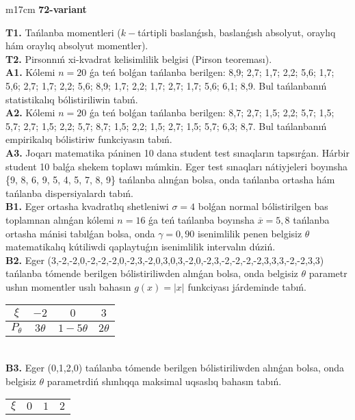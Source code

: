 \documentclass{article}
\begin{document}
\begin{tabular}{m{17cm}}
\textbf{72-variant}
\newline

\textbf{T1.} 
Tańlanba momentleri (\(k -\)tártipli baslanǵısh, baslanǵısh absolyut, oraylıq hám oraylıq absolyut momentler).
 \\
\textbf{T2.} 
Pirsonnıń xi-kvadrat kelisimlilik belgisi (Pirson teoreması).
 \\
\textbf{A1.} 
Kólemi \(n = 20\) ǵa teń bolǵan tańlanba berilgen: 8,9; 2,7; 1,7; 2,2; 5,6; 1,7; 5,6; 2,7; 1,7; 2,2; 5,6; 8,9; 1,7; 2,2; 1,7; 2,7; 1,7; 5,6; 6,1; 8,9. Bul tańlanbanıń statistikalıq bólistiriliwin tabıń.
 \\
\textbf{A2.} 
Kólemi \(n = 20\) ǵa teń bolǵan tańlanba berilgen: 8,7; 2,7; 1,5; 2,2; 5,7; 1,5; 5,7; 2,7; 1,5; 2,2; 5,7; 8,7; 1,5; 2,2; 1,5; 2,7; 1,5; 5,7; 6,3; 8,7. Bul tańlanbanıń empirikalıq bólistiriw funkciyasın tabıń.
 \\
\textbf{A3.} 
Joqarı matematika páninen 10 dana student test sınaqların tapsırǵan. Hárbir student 10 balǵa shekem toplawı múmkin. Eger test sınaqları nátiyjeleri boyınsha \{9, 8, 6, 9, 5, 4, 5, 7, 8, 9\} tańlanba alınǵan bolsa, onda tańlanba ortasha hám tańlanba dispersiyalardı tabıń.
 \\
\textbf{B1.} 
Eger ortasha kvadratlıq shetleniwi \(\sigma = 4\) bolǵan normal bólistirilgen bas toplamnan alınǵan kólemi \(n = 16\) ǵa teń tańlanba boyınsha \(\overline{x} = 5,8\) tańlanba ortasha mánisi tabılǵan bolsa, onda \(\gamma = 0,90\) isenimlilik penen belgisiz \(\theta\) matematikalıq kútiliwdi qaplaytuǵın isenimlilik intervalın dúziń.
 \\
\textbf{B2.} 
Eger (3,-2,-2,0,-2,-2,-2,0,-2,3,-2,0,3,0,3,-2,0,-2,3,-2,-2,-2,-2,3,3,3,-2,-2,3,3) tańlanba tómende berilgen bólistiriliwden alınǵan bolsa, onda belgisiz \(\theta\) parametr ushın momentler usılı bahasın \(g(x) = |x|\) funkciyası járdeminde tabıń.
\begin{tabular}{|c|c|c|c|}
  \hline
$\xi$ &
$- 2$ &
$0$ &
$3$ \\
\hline
\(P_{\theta}\) & \(3\theta\) & \(1 - 5\theta\) & \(2\theta\) \\
\hline
\end{tabular}
 \\
\textbf{B3.} 
Eger (0,1,2,0) tańlanba tómende berilgen bólistiriliwden alınǵan bolsa, onda belgisiz \(\theta\) parametrdiń shınlıqqa maksimal uqsaslıq bahasın tabıń.
\begin{tabular}{|c|c|c|c|}
  \hline
$\xi$
&
$0$
&
$1$
&
$2$\\

\end{tabular}
\end{tabular}
\end{document}
